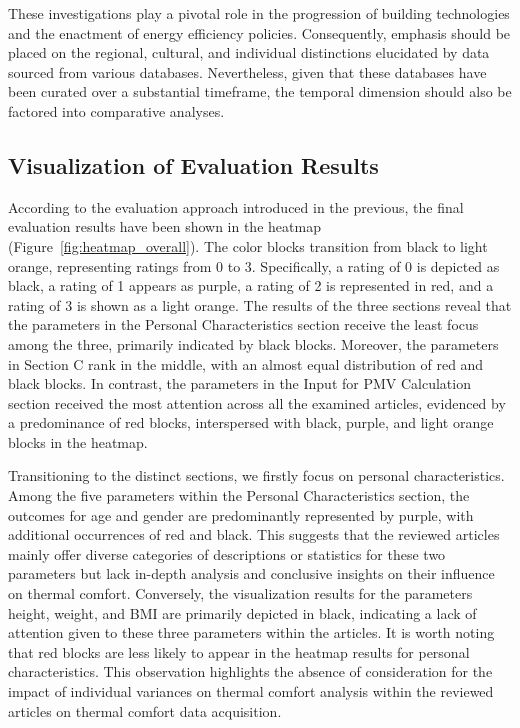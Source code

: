 \documentclass[final,3p,times,12pt]{elsarticle}
\begin{document}
These investigations play a pivotal role in the progression of building technologies and the enactment of energy efficiency policies. Consequently, emphasis should be placed on the regional, cultural, and individual distinctions elucidated by data sourced from various databases. Nevertheless, given that these databases have been curated over a substantial timeframe, the temporal dimension should also be factored into comparative analyses.

\subsection{Visualization of Evaluation Results}
\label{subsec1}

According to the evaluation approach introduced in the previous, the final evaluation results have been shown in the heatmap (Figure~\ref{fig:heatmap_overall}). The color blocks transition from black to light orange, representing ratings from 0 to 3. Specifically, a rating of 0 is depicted as black, a rating of 1 appears as purple, a rating of 2 is represented in red, and a rating of 3 is shown as a light orange. The results of the three sections reveal that the parameters in the Personal Characteristics section receive the least focus among the three, primarily indicated by black blocks. Moreover, the parameters in Section C rank in the middle, with an almost equal distribution of red and black blocks. In contrast, the parameters in the Input for PMV Calculation section received the most attention across all the examined articles, evidenced by a predominance of red blocks, interspersed with black, purple, and light orange blocks in the heatmap.

Transitioning to the distinct sections, we firstly focus on personal characteristics. Among the five parameters within the Personal Characteristics section, the outcomes for age and gender are predominantly represented by purple, with additional occurrences of red and black. This suggests that the reviewed articles mainly offer diverse categories of descriptions or statistics for these two parameters but lack in-depth analysis and conclusive insights on their influence on thermal comfort. Conversely, the visualization results for the parameters height, weight, and BMI are primarily depicted in black, indicating a lack of attention given to these three parameters within the articles. It is worth noting that red blocks are less likely to appear in the heatmap results for personal characteristics. This observation highlights the absence of consideration for the impact of individual variances on thermal comfort analysis within the reviewed articles on thermal comfort data acquisition. 
\end{document}
